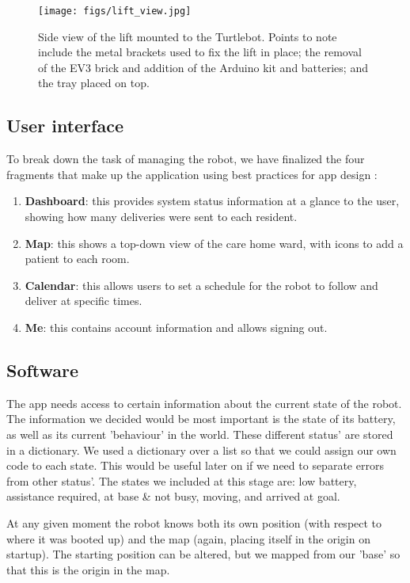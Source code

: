 \documentclass{article}
\begin{document}
\begin{figure}
  \begin{center}
    \texttt{[image: figs/lift\_view.jpg]}
    \caption{Side view of the lift mounted to the Turtlebot. Points to note include the metal brackets used to fix the lift in place; the removal of the EV3 brick and addition of the Arduino kit and batteries; and the tray placed on top.}
  \label{fig:lift}
  \end{center}
\end{figure}

\subsection{User interface}
To break down the task of managing the robot, we have finalized the four fragments that make up the application using best practices for app design \cite{design, ux}:
\begin{enumerate}
  \item {\bf Dashboard}: this provides system status information at a glance to the user, showing how many deliveries were sent to each resident.
  \item {\bf Map}: this shows a top-down view of the care home ward, with icons to add a patient to each room.
  \item {\bf Calendar}: this allows users to set a schedule for the robot to follow and deliver at specific times.
  \item {\bf Me}: this contains account information and allows signing out. 
\end{enumerate}
\subsection{Software}

The app needs access to certain information about the current state of the robot. The information we decided would be most important is the state of its battery, as well as its current 'behaviour' in the world. These different status' are stored in a dictionary. We used a dictionary over a list so that we could assign our own code to each state. This would be useful later on if we need to separate errors from other status'. The states we included at this stage are: low battery, assistance required, at base \& not busy, moving, and arrived at goal.

At any given moment the robot knows both its own position (with respect to where it was booted up) and the map (again, placing itself in the origin on startup). The starting position can be altered, but we mapped from our 'base' so that this is the origin in the map.
\end{document}
